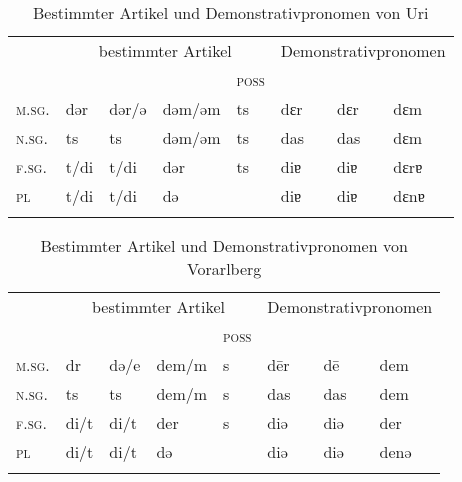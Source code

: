 \begin{table}[H]
	\caption{Bestimmter Artikel und Demonstrativpronomen von Uri \citep[194-195]{Clauß1929}}\label{table88}
	\begin{tabular}{llllllll}
		\lsptoprule
		& \multicolumn{4}{c}{bestimmter Artikel} & \multicolumn{3}{c}{Demonstrativpronomen}\\\cmidrule(lr){2-5}\cmidrule(lr){6-8}
		& \NOM & \AKK & \DAT & \textsc{poss} & \NOM & \AKK & \DAT\\\midrule
		\textsc{m.sg.} & dər & dər/ə & dəm/əm & ts & dɛr & dɛr & dɛm\\
		\textsc{n.sg.} & ts & ts & dəm/əm & ts & das & das & dɛm\\
		\textsc{f.sg.} & t/di & t/di & dər & ts & diɐ & diɐ & dɛrɐ\\
		\textsc{pl} & t/di & t/di & də &  & diɐ & diɐ & dɛnɐ\\
		\lspbottomrule
	\end{tabular}
\end{table}


\begin{table}[H]
	\caption{Bestimmter Artikel und Demonstrativpronomen von Vorarlberg \citep[276-279]{Jutz1925}}\label{table89}
	\begin{tabular}{llllllll}
		\lsptoprule
		& \multicolumn{4}{c}{bestimmter Artikel}  & \multicolumn{3}{c}{Demonstrativpronomen} \\\cmidrule(lr){2-5}\cmidrule(lr){6-8}
		& \NOM & \AKK & \DAT & \textsc{poss} & \NOM & \AKK & \DAT\\\midrule
		\textsc{m.sg.} & dr & də/e & dem/m & s & d\=er & d\=e & dem\\
		\textsc{n.sg.} & ts & ts & dem/m & s & das & das & dem\\
		\textsc{f.sg.} & di/t & di/t & der & s & diə & diə & der\\
		\textsc{pl} & di/t & di/t & də &  & diə & diə & denə\\
		\lspbottomrule
	\end{tabular}
\end{table}


